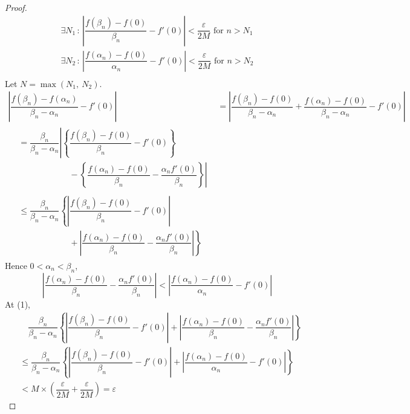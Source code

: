 \documentclass[12pt]{book}
\theoremstyle{definition}
\begin{document}
\begin{proof}
\begin{align*}
				\exists N_1\,:\,\left\vert\dfrac{f(\beta_n)-f(0)}{\beta_n}-f'(0)\right\vert<\dfrac{\varepsilon}{2M}\text{ for }n>N_1\\
				\exists N_2\,:\,\left\vert\dfrac{f(\alpha_n)-f(0)}{\alpha_n}-f'(0)\right\vert<\dfrac{\varepsilon}{2M}\text{ for }n>N_2\\
			\end{align*}
			Let $N=\max(N_1,~N_2).$\\
			\begin{align}
				\left\vert\dfrac{f(\beta_n)-f(\alpha_n)}{\beta_n-\alpha_n}-f'(0)\right\vert &= \left\vert\dfrac{f(\beta_n)-f(0)}{\beta_n-\alpha_n}+\dfrac{f(\alpha_n)-f(0)}{\beta_n-\alpha_n}-f'(0)\right\vert\nonumber\\
				\begin{split}\nonumber
					&=\dfrac{\beta_n}{\beta_n-\alpha_n}\left\vert\left\{\dfrac{f(\beta_n)-f(0)}{\beta_n}- f'(0)\right\}\right.\\
					&\qquad\qquad\qquad -\left.{\left\{\dfrac{f(\alpha_n)-f(0)}{\beta_n}- \dfrac{\alpha_n f'(0)}{\beta_n}\right\}}\right\vert
				\end{split}\\
				\begin{split}
					&\leq\dfrac{\beta_n}{\beta_n-\alpha_n}\left\{\left\vert \dfrac{f(\beta_n)-f(0)}{\beta_n}-f'(0)\right\vert\right.\\
					&\qquad\qquad\qquad +\left.{\left\vert \dfrac{f(\alpha_n)-f(0)}{\beta_n}-\dfrac{\alpha_n f'(0)}{\beta_n}\right\vert}\right\}
				\end{split}
			\end{align}
			Hence $0<\alpha_n<\beta_n$,
			\begin{equation*}
				\left\vert \dfrac{f(\alpha_n)-f(0)}{\beta_n}-\dfrac{\alpha_n f'(0)}{\beta_n}\right\vert<\left\vert\dfrac{f(\alpha_n)-f(0)}{\alpha_n}-f'(0)\right\vert
			\end{equation*}
			At (1),
			\begin{align*}
					&\quad \dfrac{\beta_n}{\beta_n-\alpha_n}\left\{\left\vert \dfrac{f(\beta_n)-f(0)}{\beta_n}-f'(0)\right\vert\right. +\left.{\left\vert \dfrac{f(\alpha_n)-f(0)}{\beta_n}-\dfrac{\alpha_n f'(0)}{\beta_n}\right\vert}\right\}\\
					&\leq \dfrac{\beta_n}{\beta_n-\alpha_n}\left\{\left\vert \dfrac{f(\beta_n)-f(0)}{\beta_n}-f'(0)\right\vert\right. +\left.{\left\vert \dfrac{f(\alpha_n)-f(0)}{\alpha_n}-f'(0)\right\vert}\right\}\\
					&<M\times \left(\dfrac{\varepsilon}{2M}+\dfrac{\varepsilon}{2M}\right)=\varepsilon

\end{align*}
\end{proof}
\end{document}
